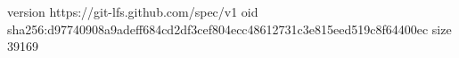 version https://git-lfs.github.com/spec/v1
oid sha256:d97740908a9adeff684cd2df3cef804ecc48612731c3e815eed519c8f64400ec
size 39169
